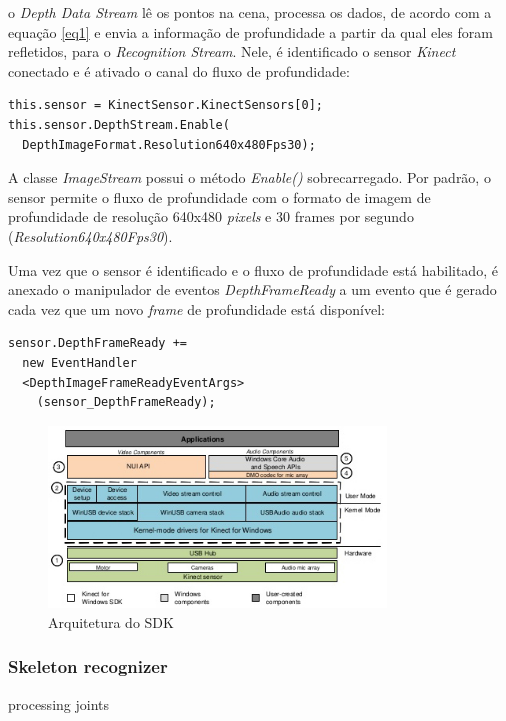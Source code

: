 o \textit{Depth Data Stream} lê os pontos na cena, processa os dados, de acordo com a equação \ref{eq1} e envia a informação de profundidade a partir da qual eles foram refletidos, para o \textit{Recognition Stream}. Nele, é identificado o sensor \textit{Kinect} conectado e é ativado o canal do fluxo de profundidade:

\begin{verbatim}
this.sensor = KinectSensor.KinectSensors[0];
this.sensor.DepthStream.Enable(
  DepthImageFormat.Resolution640x480Fps30);
\end{verbatim}

A classe \textit{ImageStream} possui o método \textit{Enable()} sobrecarregado. Por padrão, o sensor permite o fluxo de profundidade com o formato de imagem de profundidade de resolução 640x480 \textit{pixels} e 30 frames por segundo (\textit{Resolution640x480Fps30}).

Uma vez que o sensor é identificado e o fluxo de profundidade está habilitado, é anexado o manipulador de eventos \textit{DepthFrameReady} a um evento que é gerado cada vez que um novo \textit{frame} de profundidade está disponível:

\begin{verbatim}
sensor.DepthFrameReady +=
  new EventHandler
  <DepthImageFrameReadyEventArgs>
    (sensor_DepthFrameReady);
\end{verbatim}


\begin{figure}[ht]
\centering
\includegraphics[width=0.8\textwidth]{images/sdk_architecture_color.png}
\caption{Arquitetura do SDK}
\label{fig:sdk_architecture_color}
\end{figure}

\subsubsection{Skeleton recognizer }\label{sec:skeleton}
processing joints

